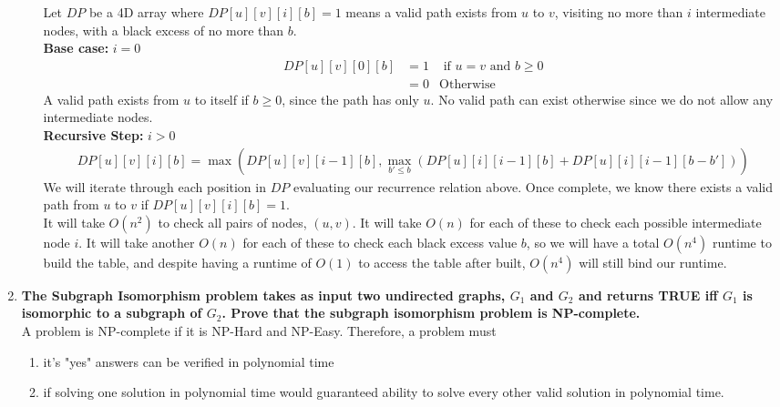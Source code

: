 \documentclass{article}
\begin{document}
\begin{enumerate}
\begin{enumerate}
Let $DP$ be a 4D array where $DP[u][v][i][b] = 1$ means a valid path exists from $u$ to $v$, visiting no more than $i$ intermediate nodes, with a black excess of no more than $b$. \\
\newline 
\textbf{Base case: } $i=0$
\begin{align*}
    DP[u][v][0][b] & = 1 & \text{ if }u=v \text{ and } b \geq 0 \\
    & = 0 & \text{Otherwise}
\end{align*}
A valid path exists from $u$ to itself if $b \geq 0$, since the path has only $u$. No valid path can exist otherwise since we do not allow any intermediate nodes. \\
\newline 
\textbf{Recursive Step:} $i > 0$
\begin{align*}
    DP[u][v][i][b] = \max( DP[u][v][i-1][b], \max_{b' \leq b}( DP[u][i][i-1][b] + DP[u][i][i-1][b-b'] ) )
\end{align*}
We will iterate through each position in $DP$ evaluating our recurrence relation above. Once complete, we know there exists a valid path from $u$ to $v$ if $DP[u][v][i][b] = 1$. \\
\newline 
It will take $O(n^2)$ to check all pairs of nodes, $(u,v)$. It will take $O(n)$ for each of these to check each possible intermediate node $i$. It will take another $O(n)$ for each of these to check each black excess value $b$, so we will have a total $O(n^4)$ runtime to build the table, and despite having a runtime of $O(1)$ to access the table after built, $O(n^4)$ will still bind our runtime. 

\end{enumerate}










\item \textbf{The Subgraph Isomorphism problem takes as input two undirected graphs, $G_1$ and $G_2$ and returns TRUE iff $G_1$ is isomorphic to a subgraph of $G_2$. Prove that the subgraph isomorphism problem is NP-complete. } \\

A problem is NP-complete if it is NP-Hard and NP-Easy. Therefore, a problem must 
\begin{enumerate}
\item it's "yes" answers can be verified in polynomial time 
\item if solving one solution in polynomial time would guaranteed ability to solve every other valid solution in polynomial time.
\end{enumerate}


\end{enumerate}
\end{document}
